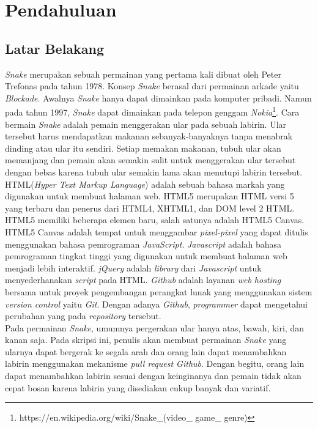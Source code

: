 \chapter{Pendahuluan}
\label{chap:intro}
   
\section{Latar Belakang}
\label{sec:label}

\textit{Snake} merupakan sebuah permainan yang pertama kali dibuat oleh Peter Trefonas pada tahun 1978. Konsep \textit{Snake} berasal dari permainan arkade yaitu \textit{Blockade}. Awalnya \textit{Snake} hanya dapat dimainkan pada komputer pribadi. Namun pada tahun 1997, \textit{Snake} dapat dimainkan pada telepon genggam \textit{Nokia}\footnote{https://en.wikipedia.org/wiki/Snake\_(video\_ game\_ genre)}. Cara bermain \textit{Snake} adalah pemain menggerakan ular pada sebuah labirin. Ular tersebut harus mendapatkan makanan sebanyak-banyaknya tanpa menabrak dinding atau ular itu sendiri. Setiap memakan makanan, tubuh ular akan memanjang dan pemain akan semakin sulit untuk menggerakan ular tersebut dengan bebas karena tubuh ular semakin lama akan menutupi labirin tersebut. \\

HTML(\textit{Hyper Text Markup Language}) adalah sebuah bahasa markah yang digunakan untuk membuat halaman web. HTML5 merupakan HTML versi 5 yang terbaru dan penerus dari HTML4, XHTML1, dan DOM level 2 HTML. HTML5 memiliki beberapa elemen baru, salah satunya adalah HTML5 Canvas. HTML5 Canvas adalah tempat untuk menggambar \textit{pixel-pixel} yang dapat ditulis menggunakan bahasa pemrograman \textit{JavaScript}. \textit{Javascript} adalah bahasa pemrograman tingkat tinggi yang digunakan untuk membuat halaman web menjadi lebih interaktif. \textit{jQuery} adalah \textit{library} dari \textit{Javascript} untuk menyederhanakan \textit{script} pada HTML. \textit{Github} adalah layanan \textit{web hosting} bersama untuk proyek pengembangan perangkat lunak yang menggunakan sistem \textit{version control} yaitu \textit{Git}. Dengan adanya \textit{Github}, \textit{programmer} dapat mengetahui perubahan yang pada \textit{repository} tersebut. \\

Pada permainan \textit{Snake}, umumnya pergerakan ular hanya atas, bawah, kiri, dan kanan saja. Pada skripsi ini, penulis akan membuat permainan \textit{Snake} yang ularnya dapat bergerak ke segala arah dan orang lain dapat menambahkan labirin menggunakan mekanisme \textit{pull request Github}. Dengan begitu, orang lain dapat menambahkan labirin sesuai dengan keinginanya dan pemain tidak akan cepat bosan karena labirin yang disediakan cukup banyak dan variatif.


